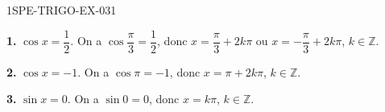 \begin{corrige}{1SPE-TRIGO-EX-031}

\textbf{1.} $\cos x = \dfrac{1}{2}$. On a $\cos\dfrac{\pi}{3} = \dfrac{1}{2}$, donc $x = \dfrac{\pi}{3} + 2k\pi$ ou $x = -\dfrac{\pi}{3} + 2k\pi$, $k \in \mathbb{Z}$.

\textbf{2.} $\cos x = -1$. On a $\cos\pi = -1$, donc $x = \pi + 2k\pi$, $k \in \mathbb{Z}$.

\textbf{3.} $\sin x = 0$. On a $\sin 0 = 0$, donc $x = k\pi$, $k \in \mathbb{Z}$.

\end{corrige}

